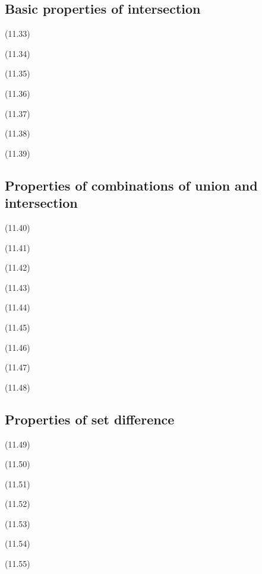 \documentclass[a4paper,10pt]{article}
\newenvironment{theoremlist}{
\begin{description}
  \setlength{\itemsep}{1.5pt}
  \setlength{\parskip}{0pt}
  \setlength{\parsep}{0pt}
}{\end{description}}
\begin{document}
\subsection{Basic properties of intersection}
\begin{theoremlist}
\item[(11.33)]									$  $
\item[(11.34)]									$  $
\item[(11.35)]									$  $
\item[(11.36)]									$  $
\item[(11.37)]									$  $
\item[(11.38)]									$  $
\item[(11.39)]									$  $
\end{theoremlist}

\subsection{Properties of combinations of union and intersection}
\begin{theoremlist}
\item[(11.40)]									$  $
\item[(11.41)]									$  $
\item[(11.42)]									$  $
\item[(11.43)]									$  $
\item[(11.44)]									$  $
\item[(11.45)]									$  $
\item[(11.46)]									$  $
\item[(11.47)]									$  $
\item[(11.48)]									$  $
\end{theoremlist}

\subsection{Properties of set difference}
\begin{theoremlist}
\item[(11.49)]									$  $
\item[(11.50)]									$  $
\item[(11.51)]									$  $
\item[(11.52)]									$  $
\item[(11.53)]									$  $
\item[(11.54)]									$  $
\item[(11.55)]									$  $	
\end{theoremlist}
\end{document}
